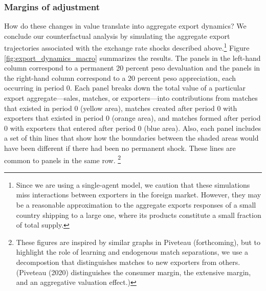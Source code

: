 \documentclass[12pt]{article}
\begin{document}
\subsubsection{Margins of adjustment}

How do these changes in value translate into aggregate export dynamics? We conclude our counterfactual analysis by simulating the aggregate export trajectories associated with the exchange rate shocks described above.\footnote{%
Since we are using a single-agent model, we caution that these simulations
miss interactions between exporters in the foreign market. However, they may
be a reasonable approximation to the aggregate exports responses of a small
country shipping to a large one, where its products constitute a small
fraction of total supply.\medskip}
Figure \ref{fig:export_dynamics_macro} summarizes the results. The panels in the left-hand column correspond to a permanent 20 percent peso devaluation and the panels in the right-hand column correspond to a 20 percent peso appreciation, each occurring in period 0. Each panel breaks down the total value of a particular export aggregate---sales, matches, or exporters---into contributions from matches that existed in period 0 (yellow area), matches created after period 0 with exporters that existed in period 0 (orange area), and matches formed after period 0 with exporters that entered after period 0 (blue area). Also, each panel includes a set of thin lines that show how the boundaries between the shaded areas would have been different if there had been no permanent shock. These lines are common to panels in the same row.%
\footnote{%
These figures are inspired by similar graphs in Piveteau (forthcoming), but to
highlight the role of learning and endogenous match separations, we use a
decompostion that distinguishes matches to new exporters from others. (Piveteau (2020) distinguishes the consumer margin, the extensive margin, and
an aggregative valuation effect.)\medskip} 
\end{document}

